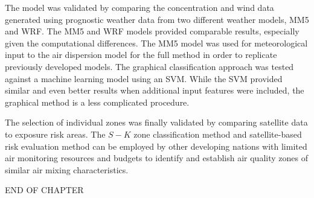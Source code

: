 The model was validated by comparing the concentration and wind data generated using prognostic weather data from two different weather models, MM5 and WRF. The MM5 and WRF models provided comparable results, especially given the computational differences. The MM5 model was used for meteorological input to the air dispersion model for the full method in order to replicate previously developed models. The graphical classification approach was tested against a machine learning model using an SVM. While the SVM provided similar and even better results when additional input features were included, the graphical method is a less complicated procedure.

The selection of individual zones was finally validated by comparing satellite data to exposure risk areas.  The $S-K$ zone classification method and satellite-based risk evaluation method can be employed by other developing nations with limited air monitoring resources and budgets to identify and establish air quality zones of similar air mixing characteristics.

\bigskip
\begin{center}
END OF CHAPTER
\end{center}